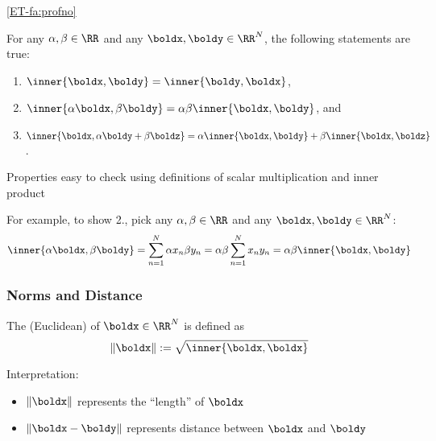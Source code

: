 \begin{frame}

    \vspace{2em}
    \Fact \eqref{ET-fa:profno}
    
    For any $\alpha, \beta \in \RR$ and any $\boldx, \boldy \in \RR^N$, the following 
    statements are true:
    \begin{enumerate}
        \item $\inner{\boldx, \boldy} = \inner{\boldy, \boldx}$,
        \item $\inner{\alpha \boldx, \beta \boldy} =  \alpha \beta
            \inner{\boldx, \boldy}$, and
        \item $\inner{\boldx, \alpha \boldy + \beta \boldz} =  \alpha
            \inner{\boldx, \boldy} + \beta \inner{\boldx, \boldz}$.
    \end{enumerate}
    
    \vspace{1em}
    Properties easy to check using definitions of scalar multiplication and inner product

    For example, to show 2.,
    pick any $\alpha, \beta \in \RR$ and any $\boldx, \boldy \in
    \RR^N$:
    \begin{equation*}
        \inner{\alpha \boldx, \beta \boldy}
        = \sum_{n=1}^N \alpha x_n \beta y_n
        = \alpha \beta \sum_{n=1}^N x_n y_n 
        = \alpha \beta \inner{\boldx, \boldy}
    \end{equation*}

\end{frame}

\begin{frame}
    \frametitle{Norms and Distance}
    
     \vspace{2em}
    The (Euclidean)  of $\boldx \in \RR^N$ is defined as
    \begin{equation*}
        \label{eq:eucnorm}
        \| \boldx \| := \sqrt{\inner{\boldx, \boldx}} 
    \end{equation*}
    
    \vspace{.7em}
    Interpretation:
    \begin{itemize}
        \item $\| \boldx \|$ represents the ``length'' of $\boldx$
            \vspace{0.5em}
        \item $\| \boldx - \boldy \|$ represents distance between $\boldx$ and $\boldy$
    \end{itemize}

\end{frame}


